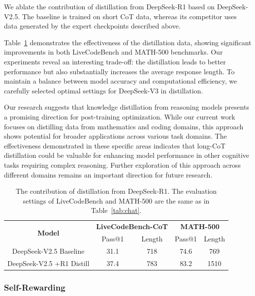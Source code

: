 \documentclass[11pt, a4paper, logo, copyright, nonumbering]{deepseek}
\newcommand{\dsviii}{DeepSeek-V3}
\begin{document}
\begin{CJK*}{UTF8}{gbsn}
We ablate the contribution of distillation from DeepSeek-R1 based on DeepSeek-V2.5. 
The baseline is trained on short CoT data, whereas its competitor uses data generated by the expert checkpoints described above. 

Table~\ref{tab:distill} demonstrates the effectiveness of the distillation data, showing significant improvements in both LiveCodeBench and MATH-500 benchmarks. 
Our experiments reveal an interesting trade-off: the distillation leads to better performance but also substantially increases the average response length. 
To maintain a balance between model accuracy and computational efficiency, we carefully selected optimal settings for \dsviii{} in distillation.

Our research suggests that knowledge distillation from reasoning models presents a promising direction for post-training optimization. 
While our current work focuses on distilling data from mathematics and coding domains, this approach shows potential for broader applications across various task domains. 
The effectiveness demonstrated in these specific areas indicates that long-CoT distillation could be valuable for enhancing model performance in other cognitive tasks requiring complex reasoning. 
Further exploration of this approach across different domains remains an important direction for future research.

\begin{table}[t]
    \centering
    \begin{tabular}{c|cc|cc}
    \toprule
    \multirow{2}{*}{\textbf{Model}} & \multicolumn{2}{c}{\textbf{LiveCodeBench-CoT}} & \multicolumn{2}{c}{\textbf{MATH-500}} \\

     & Pass@1 & Length & Pass@1 & Length\\
    \midrule
     DeepSeek-V2.5 Baseline & 31.1 & 718 & 74.6 & 769\\
     DeepSeek-V2.5 +R1 Distill & 37.4 & 783 &83.2& 1510\\
    \bottomrule
    \end{tabular}
    \caption{
    The contribution of distillation from DeepSeek-R1. 
    The evaluation settings of LiveCodeBench and MATH-500 are the same as in Table~\ref{tab:chat}.
    }
    \label{tab:distill} 
\end{table}

\subsubsection{Self-Rewarding}


\end{CJK*}
\end{document}

